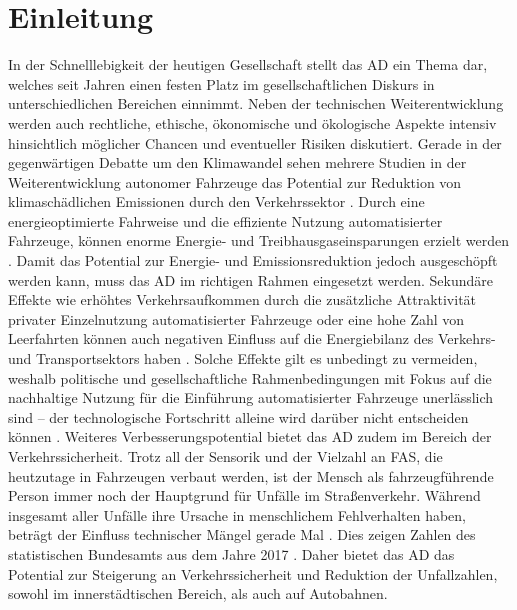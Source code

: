 \chapter{Einleitung}\label{cha:Einleitung}
In der Schnelllebigkeit der heutigen Gesellschaft stellt das \gls{AD} ein Thema dar, welches seit Jahren einen festen Platz im gesellschaftlichen Diskurs in unterschiedlichen Bereichen einnimmt. Neben der technischen Weiterentwicklung werden auch rechtliche, ethische, ökonomische und ökologische Aspekte intensiv hinsichtlich möglicher Chancen und eventueller Risiken diskutiert. Gerade in der gegenwärtigen Debatte um den Klimawandel sehen mehrere Studien in der Weiterentwicklung autonomer Fahrzeuge das Potential zur Reduktion von klimaschädlichen Emissionen durch den Verkehrssektor \cite{Brost.2020,MichaelKrail.2019,Lee.2019}. Durch eine energieoptimierte Fahrweise und die effiziente Nutzung automatisierter Fahrzeuge, können enorme Energie- und Treibhausgaseinsparungen erzielt werden \cite{MichaelKrail.2019}. Damit das Potential zur Energie- und Emissionsreduktion jedoch ausgeschöpft werden kann, muss das \gls{AD} im richtigen Rahmen eingesetzt werden. Sekundäre Effekte wie erhöhtes Verkehrsaufkommen durch die zusätzliche Attraktivität privater Einzelnutzung automatisierter Fahrzeuge oder eine hohe Zahl von Leerfahrten können auch negativen Einfluss auf die Energiebilanz des Verkehrs- und Transportsektors haben \cite{MichaelKrail.2019,AgoraVerkehrswende.082020}. Solche Effekte gilt es unbedingt zu vermeiden, weshalb politische und gesellschaftliche Rahmenbedingungen mit Fokus auf die nachhaltige Nutzung für die Einführung automatisierter Fahrzeuge unerlässlich sind -- der technologische Fortschritt alleine wird darüber nicht entscheiden können \cite{AgoraVerkehrswende.082020}. Weiteres Verbesserungspotential bietet das \gls{AD} zudem im Bereich der Verkehrssicherheit. Trotz all der Sensorik und der Vielzahl an \gls{FAS}, die heutzutage in Fahrzeugen verbaut werden, ist der Mensch als fahrzeugführende Person immer noch der Hauptgrund für Unfälle im Straßenverkehr. Während insgesamt  aller Unfälle ihre Ursache in menschlichem Fehlverhalten haben, beträgt der Einfluss technischer Mängel gerade Mal . Dies zeigen Zahlen des statistischen Bundesamts aus dem Jahre 2017 \cite{StatistischesBundesamt.2017}. Daher bietet das \gls{AD} das Potential zur Steigerung an Verkehrssicherheit und Reduktion der Unfallzahlen, sowohl im innerstädtischen Bereich, als auch auf Autobahnen. 

